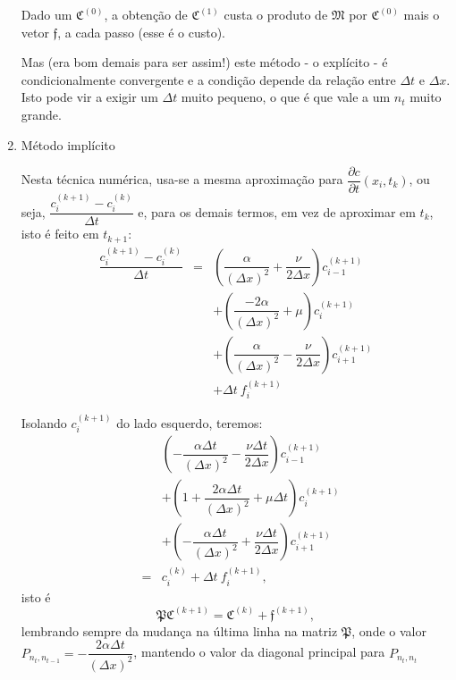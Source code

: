 \begin{enumerate}
\begin{remark}
Dado um $\mathfrak{C}^{(0)}$, a obtenção de $\mathfrak{C}^{(1)}$ custa o produto de $\mathfrak{M}$ por $\mathfrak{C}^{(0)}$ mais o vetor $\mathfrak{f}$, a cada passo (esse é o custo).
\end{remark}

Mas (era bom demais para ser assim!) este método - o explícito - é condicionalmente convergente e a condição depende da relação entre $\Delta t$ e $\Delta x$. Isto pode vir a exigir um $\Delta t$ muito pequeno, o que é que vale a um $n_{t}$ muito grande.

\item Método implícito 

Nesta técnica numérica, usa-se a mesma aproximação para $\dfrac{\partial c}{\partial t} (x_{i},t_{k})$, ou seja, $\dfrac{c_{i}^{(k+1)} - c_{i}^{(k)}}{\Delta t}$ e, para os demais termos, em vez de aproximar em $t_{k}$, isto é feito em $t_{k+1}$:
$$\begin{array}{rcl}
\dfrac{c_{i}^{(k+1)}-c_{i}^{(k)}}{\Delta t}  
&=&
\left(\dfrac{\alpha}{(\Delta x)^{2}} + \dfrac{\nu}{2\Delta x}\right) c_{i-1}^{(k+1)} \\[0.3cm]
&& +
\left(\dfrac{-2\alpha}{(\Delta x)^{2}} + \mu\right) c_{i}^{(k+1)} \\[0.3cm]
&& +
\left(\dfrac{\alpha}{(\Delta x)^{2}}-\dfrac{\nu}{2 \Delta x} \right) c_{i+1}^{(k+1)} \\[0.3cm]
&& + \Delta t ~ f_{i}^{(k+1)}
\end{array}$$

Isolando $c_{i}^{(k+1)}$ do lado esquerdo, teremos:
$$\begin{array}{rcl}
& & \left(-\dfrac{\alpha \Delta t}{(\Delta x)^{2}}-\dfrac{\nu \Delta t}{2 \Delta x}\right) c_{i-1}^{(k+1)} \\[0.3cm]
&&+
\left(1 + \dfrac{2 \alpha \Delta t}{(\Delta x)^{2}} +
\mu \Delta t \right) c_{i}^{(k+1)} \\[0.3cm]
&&+
\left(-\dfrac{\alpha \Delta t}{(\Delta x)^{2}}+
\dfrac{\nu\Delta t}{2 \Delta x}\right) c_{i+1}^{(k+1)} \\[0.3cm]
&=& c_{i}^{(k)} + \Delta t ~ f_{i}^{(k+1)},
\end{array}$$
isto é 
$$\mathfrak{P} \mathfrak{C}^{(k+1)} =  \mathfrak{C}^{(k)} + \mathfrak{f}^{( k+1)},
$$
lembrando sempre da mudança na última linha na matriz $\mathfrak{P}$, onde o valor $P_{n_{t},n_{t-1}} = -\dfrac{2\alpha \Delta t}{(\Delta x)^{2}}$, mantendo o valor da diagonal principal para $P_{n_{t},n_{t}}$


\end{enumerate}
